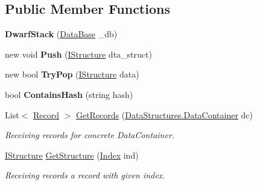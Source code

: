 \subsection*{Public Member Functions}
\begin{DoxyCompactItemize}
\item 
\hypertarget{class_dwarf_d_b_1_1_stack_1_1_dwarf_stack_ad48677010f3ce3899b9467616fd9a7ee}{
{\bfseries DwarfStack} (\hyperlink{class_dwarf_d_b_1_1_data_structures_1_1_data_base}{DataBase} \_\-db)}
\label{class_dwarf_d_b_1_1_stack_1_1_dwarf_stack_ad48677010f3ce3899b9467616fd9a7ee}

\item 
\hypertarget{class_dwarf_d_b_1_1_stack_1_1_dwarf_stack_a885ad9cdfe63a8f8d5c55ffda79b075f}{
new void {\bfseries Push} (\hyperlink{interface_dwarf_d_b_1_1_data_structures_1_1_i_structure}{IStructure} dta\_\-struct)}
\label{class_dwarf_d_b_1_1_stack_1_1_dwarf_stack_a885ad9cdfe63a8f8d5c55ffda79b075f}

\item 
\hypertarget{class_dwarf_d_b_1_1_stack_1_1_dwarf_stack_a4b56dab4ce355bf6b5d85861d75a3ca8}{
new bool {\bfseries TryPop} (\hyperlink{interface_dwarf_d_b_1_1_data_structures_1_1_i_structure}{IStructure} data)}
\label{class_dwarf_d_b_1_1_stack_1_1_dwarf_stack_a4b56dab4ce355bf6b5d85861d75a3ca8}

\item 
\hypertarget{class_dwarf_d_b_1_1_stack_1_1_dwarf_stack_ad9a9e05a598682086956db2bfaba217a}{
bool {\bfseries ContainsHash} (string hash)}
\label{class_dwarf_d_b_1_1_stack_1_1_dwarf_stack_ad9a9e05a598682086956db2bfaba217a}

\item 
List$<$ \hyperlink{class_dwarf_d_b_1_1_data_structures_1_1_record}{Record} $>$ \hyperlink{class_dwarf_d_b_1_1_stack_1_1_dwarf_stack_adca3ef11aa4b86f2f6de7f33e06bb13c}{GetRecords} (\hyperlink{class_dwarf_d_b_1_1_data_structures_1_1_data_container}{DataStructures.DataContainer} dc)
\begin{DoxyCompactList}\small\item\em Receiving records for concrete DataContainer. \item\end{DoxyCompactList}\item 
\hyperlink{interface_dwarf_d_b_1_1_data_structures_1_1_i_structure}{IStructure} \hyperlink{class_dwarf_d_b_1_1_stack_1_1_dwarf_stack_a1cf7979ccc18a74d5a2ff3e0205ca2c7}{GetStructure} (\hyperlink{class_dwarf_d_b_1_1_data_structures_1_1_index}{Index} ind)
\begin{DoxyCompactList}\small\item\em Receiving records a record with given index. \item\end{DoxyCompactList}\end{DoxyCompactItemize}

